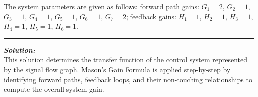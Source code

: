 \documentclass[11pt]{article}
\begin{document}
\noindent The system parameters are given as follows: forward path gains: \( G_1 = 2 \), \( G_2 = 1 \), \( G_3 = 1 \), \( G_4 = 1 \), \( G_5 = 1 \), \( G_6 = 1 \), \( G_7 = 2 \); feedback gains: \( H_1 = 1 \), \( H_2 = 1 \), \( H_3 = 1 \), \( H_4 = 1 \), \( H_5 = 1 \), \( H_6 = 1 \). \\
\noindent\rule{\textwidth}{1pt}

\vspace{12pt}   

\noindent \textbf{\textit{Solution:}}
\\ This solution determines the transfer function of the control system represented by the signal flow graph. Mason's Gain Formula is applied step-by-step by identifying forward paths, feedback loops, and their non-touching relationships to compute the overall system gain.\\
\end{document}

